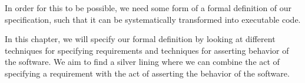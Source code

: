 In order for this to be possible, we need some form of a formal definition of our specification, such that it can be systematically transformed into executable code.

In this chapter, we will specify our formal definition by looking at different techniques for specifying requirements and techniques for asserting behavior of the software.
We aim to find a silver lining where we can combine the act of specifying a requirement with the act of asserting the behavior of the software. 
